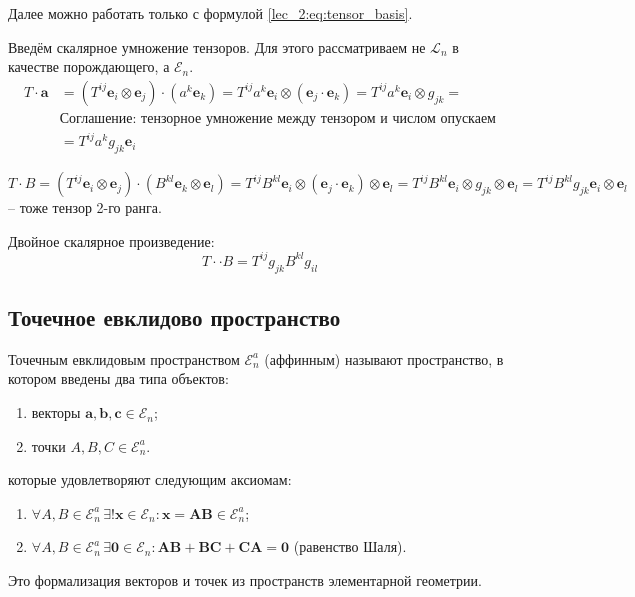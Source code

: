 Далее можно работать только с формулой \eqref{lec_2:eq:tensor_basis}.

Введём скалярное умножение тензоров. Для этого рассматриваем не $\mathcal{L}_n$ в качестве
порождающего, а $\mathcal{E}_n$.
\begin{align*}
  T \cdot \mathbf{a} &= (T^{ij} \mathbf{e}_i \otimes \mathbf{e}_j) \cdot (a^k \mathbf{e}_k)
  = T^{ij} a^k \mathbf{e}_i \otimes (\mathbf{e}_j \cdot \mathbf{e}_k)
  = T^{ij} a^k \mathbf{e}_i \otimes g_{jk} = \\
  &\text{Соглашение: тензорное умножение между тензором и числом опускаем} \\
  &= T^{ij} a^k g_{jk} \mathbf{e}_i
\end{align*}

\[
  T \cdot B = (T^{ij} \mathbf{e}_i \otimes \mathbf{e}_j) \cdot (B^{kl} \mathbf{e}_k \otimes \mathbf{e}_l)
  = T^{ij} B^{kl} \mathbf{e}_i \otimes (\mathbf{e}_j \cdot \mathbf{e}_k) \otimes \mathbf{e}_l
  = T^{ij} B^{kl} \mathbf{e}_i \otimes g_{jk} \otimes \mathbf{e}_l
  = T^{ij} B^{kl} g_{jk} \mathbf{e}_i \otimes \mathbf{e}_l
\]
-- тоже тензор 2-го ранга.

Двойное скалярное произведение:
\[
  T \cdot \cdot B = T^{ij} g_{jk} B^{kl} g_{il}
\]

\subsection{Точечное евклидово пространство}

\begin{definition}
  Точечным евклидовым пространством $\mathcal{E}_n^a$ (аффинным) называют пространство, в котором
  введены два типа объектов:
  \begin{enumerate}
    \item векторы $\mathbf{a}, \mathbf{b}, \mathbf{c} \in \mathcal{E}_n$;
    \item точки $A, B, C \in \mathcal{E}_n^a$.
  \end{enumerate}
  которые удовлетворяют следующим аксиомам:
  \begin{enumerate}
    \item $\forall A, B \in \mathcal{E}_n^a \, \exists! \mathbf{x} \in \mathcal{E}_n : \mathbf{x} = \mathbf{AB} \in \mathcal{E}_n^a$;
    \item $\forall A, B \in \mathcal{E}_n^a \, \exists \mathbf{0} \in \mathcal{E}_n : \mathbf{AB} + \mathbf{BC} + \mathbf{CA} = \mathbf{0}$ (равенство Шаля).
  \end{enumerate}
  Это формализация векторов и точек из пространств элементарной геометрии.
\end{definition}

